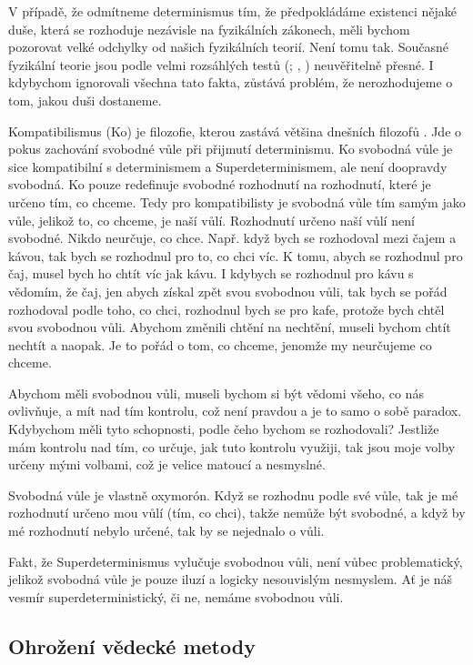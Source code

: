 V případě, že odmítneme determinismus tím, že předpokládáme existenci nějaké duše, která se rozhoduje nezávisle na fyzikálních zákonech, měli bychom pozorovat velké odchylky od našich fyzikálních teorií. Není tomu tak. Současné fyzikální teorie jsou podle velmi rozsáhlých testů (\cite{GenRelAcc}; , \cite*{QEDAcc}) neuvěřitelně přesné. I kdybychom ignorovali všechna tato fakta, zůstává problém, že nerozhodujeme o tom, jakou duši dostaneme.

Kompatibilismus (Ko) je filozofie, kterou zastává většina dnešních filozofů \parencite{FWSur}. Jde o pokus zachování svobodné vůle při přijmutí determinismu. Ko svobodná vůle je sice kompatibilní s determinismem a Superdeterminismem, ale není doopravdy svobodná. Ko pouze redefinuje svobodné rozhodnutí na rozhodnutí, které je určeno tím, co chceme. Tedy pro kompatibilisty je svobodná vůle tím samým jako vůle, jelikož to, co chceme, je naší vůlí. Rozhodnutí určeno naší vůlí není svobodné. Nikdo neurčuje, co chce. Např. když bych se rozhodoval mezi čajem a kávou, tak bych se rozhodnul pro to, co chci víc. K tomu, abych se rozhodnul pro čaj, musel bych ho chtít víc jak kávu. I kdybych se rozhodnul pro kávu s vědomím, že  čaj, jen abych získal zpět svou svobodnou vůli, tak bych se pořád rozhodoval podle toho, co chci, rozhodnul bych se pro kafe, protože bych chtěl  svou svobodnou vůli. Abychom změnili chtění na nechtění, museli bychom chtít nechtít a naopak. Je to pořád o tom, co chceme, jenomže my neurčujeme co chceme.

Abychom měli svobodnou vůli, museli bychom si být vědomi všeho, co nás ovlivňuje, a mít nad tím kontrolu, což není pravdou a je to samo o sobě paradox. Kdybychom měli tyto schopnosti, podle čeho bychom se rozhodovali? Jestliže mám kontrolu nad tím, co určuje, jak tuto kontrolu využiji, tak jsou moje volby určeny mými volbami, což je velice matoucí a nesmyslné.

Svobodná vůle je vlastně oxymorón. Když se rozhodnu podle své vůle, tak je mé rozhodnutí určeno mou vůlí (tím, co chci), takže nemůže být svobodné, a když by mé rozhodnutí nebylo určené, tak by se nejednalo o vůli.

Fakt, že Superdeterminismus vylučuje svobodnou vůli, není vůbec problematický, jelikož svobodná vůle je pouze iluzí a logicky nesouvislým nesmyslem. Ať je náš vesmír superdeterministický, či ne, nemáme svobodnou vůli.

\clearpage

\subsection{Ohrožení vědecké metody}

